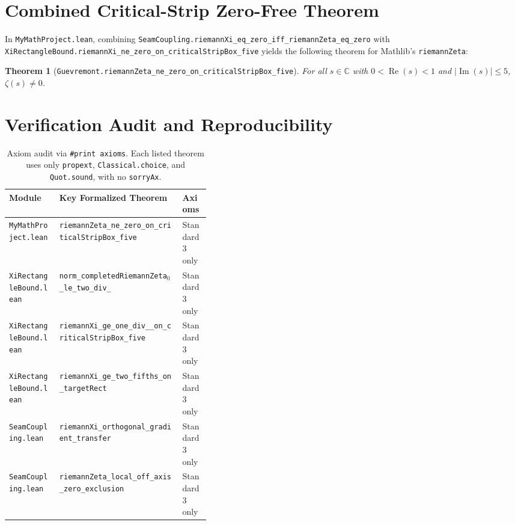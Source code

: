 \documentclass[11pt]{article}
\newtheorem{theorem}{Theorem}[section]
\theoremstyle{remark}
\begin{document}
\section{Combined Critical-Strip Zero-Free Theorem}

In \texttt{MyMathProject.lean}, combining \texttt{SeamCoupling.\allowbreak riemannXi\_\allowbreak eq\_\allowbreak zero\_\allowbreak iff\_\allowbreak riemannZeta\_\allowbreak eq\_\allowbreak zero} with \texttt{XiRectangleBound.\allowbreak riemannXi\_\allowbreak ne\_\allowbreak zero\_\allowbreak on\_\allowbreak criticalStripBox\_\allowbreak five} yields the following theorem for Mathlib's \texttt{riemannZeta}:

\begin{theorem}[\texttt{Guevremont.\allowbreak riemannZeta\_\allowbreak ne\_\allowbreak zero\_\allowbreak on\_\allowbreak criticalStripBox\_\allowbreak five}]
For all $s \in \mathbb{C}$ with $0 < \operatorname{Re}(s) < 1$ and $|\operatorname{Im}(s)| \le 5$, $\zeta(s) \neq 0$.
\end{theorem}

\section{Verification Audit and Reproducibility}

\begin{table}[h]
\centering
\small
\begin{tabularx}{\linewidth}{@{}>{\raggedright\arraybackslash}p{0.25\linewidth}>{\raggedright\arraybackslash}X>{\raggedright\arraybackslash}p{0.14\linewidth}@{}}
\toprule
\textbf{Module} & \textbf{Key Formalized Theorem} & \textbf{Axioms} \\
\midrule
\texttt{MyMathProject.lean} & \texttt{riemannZeta\_\allowbreak ne\_\allowbreak zero\_\allowbreak on\_\allowbreak criticalStripBox\_\allowbreak five} & Standard 3 only \\
\texttt{XiRectangleBound.lean} & \texttt{norm\_\allowbreak completedRiemannZeta$_0$\_\allowbreak le\_\allowbreak two\_\allowbreak div\_\allowbreak 57} & Standard 3 only \\
\texttt{XiRectangleBound.lean} & \texttt{riemannXi\_\allowbreak ge\_\allowbreak one\_\allowbreak div\_\allowbreak 19\_\allowbreak on\_\allowbreak criticalStripBox\_\allowbreak five} & Standard 3 only \\
\texttt{XiRectangleBound.lean} & \texttt{riemannXi\_\allowbreak ge\_\allowbreak two\_\allowbreak fifths\_\allowbreak on\_\allowbreak targetRect} & Standard 3 only \\
\texttt{SeamCoupling.lean} & \texttt{riemannXi\_\allowbreak orthogonal\_\allowbreak gradient\_\allowbreak transfer} & Standard 3 only \\
\texttt{SeamCoupling.lean} & \texttt{riemannZeta\_\allowbreak local\_\allowbreak off\_\allowbreak axis\_\allowbreak zero\_\allowbreak exclusion} & Standard 3 only \\
\bottomrule
\end{tabularx}
\caption{Axiom audit via \texttt{\#print axioms}. Each listed theorem uses only \texttt{propext}, \texttt{Classical.choice}, and \texttt{Quot.sound}, with no \texttt{sorryAx}.}
\end{table}
\end{document}
